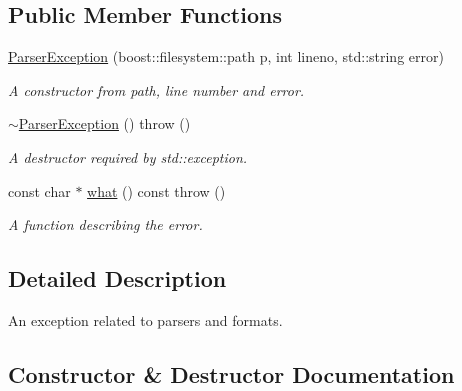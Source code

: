 \subsection*{Public Member Functions}
\begin{DoxyCompactItemize}
\item 
\hyperlink{class_r_c_f_1_1_common_1_1_parser_exception_a5bd15dbf761e09667d86cdd95f980c1b}{Parser\+Exception} (boost\+::filesystem\+::path p, int lineno, std\+::string error)
\begin{DoxyCompactList}\small\item\em A constructor from path, line number and error. \end{DoxyCompactList}\item 
\hypertarget{class_r_c_f_1_1_common_1_1_parser_exception_a99641ad3822bfaa19b4253009fe3c9b3}{}\hyperlink{class_r_c_f_1_1_common_1_1_parser_exception_a99641ad3822bfaa19b4253009fe3c9b3}{$\sim$\+Parser\+Exception} ()  throw ()\label{class_r_c_f_1_1_common_1_1_parser_exception_a99641ad3822bfaa19b4253009fe3c9b3}

\begin{DoxyCompactList}\small\item\em A destructor required by std\+::exception. \end{DoxyCompactList}\item 
const char $\ast$ \hyperlink{class_r_c_f_1_1_common_1_1_parser_exception_a84c7447eaa30971c56fd0cb974095a2a}{what} () const   throw ()
\begin{DoxyCompactList}\small\item\em A function describing the error. \end{DoxyCompactList}\end{DoxyCompactItemize}


\subsection{Detailed Description}
An exception related to parsers and formats. 

\subsection{Constructor \& Destructor Documentation}
\hypertarget{class_r_c_f_1_1_common_1_1_parser_exception_a5bd15dbf761e09667d86cdd95f980c1b}{}
